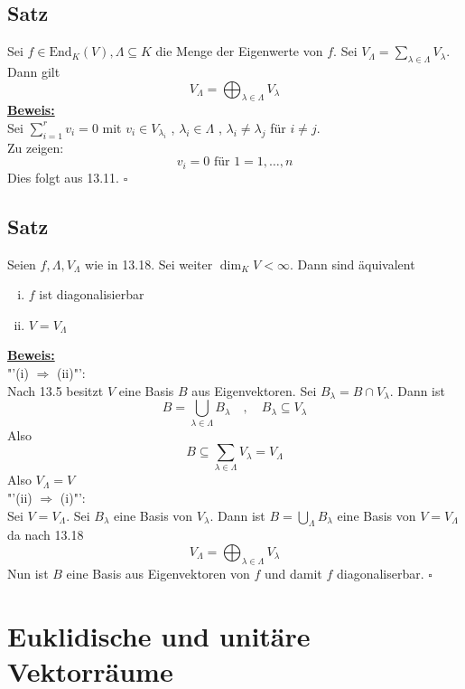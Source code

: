 \subsection{Satz} %
\label{sub:satz}
Sei $f \in \text{End}_K (V) , \Lambda \subseteq K $ die Menge der Eigenwerte von $f$. Sei $V_\Lambda = \sum\limits_{\lambda \in \Lambda} V_\lambda$. Dann gilt
\[
	V_\Lambda = \bigoplus_{\lambda \in \Lambda} V_\lambda 
\]
\underline{\textbf{Beweis:}} \\
Sei $\sum\limits_{i=1}^{r} v_i = 0 $ mit $v_i \in V_{\lambda_i}$ , $\lambda_i \in \Lambda$ , $\lambda_i \not= \lambda_j$ für $i \not= j$. \\
Zu zeigen: 
\[
	v_i = 0 \text{ für } 1= 1, \ldots , n
\]
Dies folgt aus 13.11. \hfill \( \square \)

\subsection{Satz} %
\label{sub:satz}
Seien $f, \Lambda, V_\Lambda$ wie in 13.18. Sei weiter $\dim_K V < \infty$. Dann sind äquivalent
\begin{enumerate}[(i)]
	\item $f$ ist diagonalisierbar
	\item $V= V_\Lambda$
\end{enumerate}
\underline{\textbf{Beweis:}} \\
"'(i) $\Rightarrow $ (ii)"': \\
Nach 13.5 besitzt $V$ eine Basis $B$ aus Eigenvektoren. Sei $B_\lambda = B \cap V_\lambda $. Dann ist 
\[
	B= \bigcup_{\lambda \in \Lambda} B_\lambda \quad , \quad B_\lambda \subseteq V_\lambda 
\]
Also 
\[
	B \subseteq \sum\limits_{\lambda \in \Lambda} V_\lambda  = V_\Lambda 
\]
Also $V_\Lambda = V$
\vspace{10pt} \\
"'(ii) $\Rightarrow $ (i)"': \\
Sei $V=V_\Lambda$. Sei $B_\lambda $ eine Basis von $V_\lambda$. Dann ist $B= \bigcup_\Lambda B_\lambda $ eine Basis von $V=V_\Lambda$ da nach 13.18
\[
	V_\Lambda = \bigoplus_{\lambda \in \Lambda} V_\lambda 
\]
Nun ist $B$ eine Basis aus Eigenvektoren von $f$ und damit $f$ diagonaliserbar. \hfill \( \square \)


\newpage
\section{Euklidische und unitäre Vektorräume} %
\label{sec:euklidische_und_unitäre_vektorräume}

